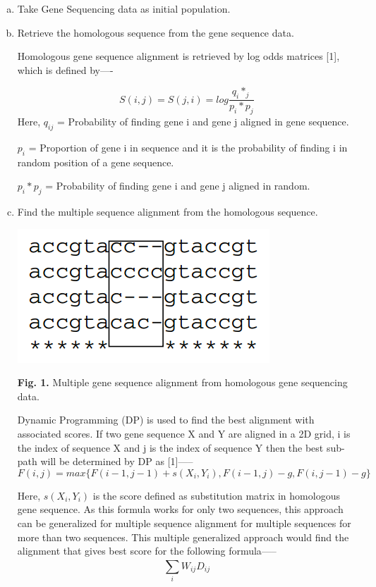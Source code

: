\documentclass[preprint,12pt]{elsarticle}
\begin{document}
\begin{enumerate}[a)] %
	\item Take Gene Sequencing data as initial population.
    \item Retrieve the homologous sequence from the gene sequence data. 



Homologous gene sequence alignment is retrieved by log odds matrices [1], which is defined by—-

$$S(i,j)=S(j,i)=log \frac{q_i*_j}{p_i*p_j}$$
Here, $q_{ij}$ = Probability of finding gene i and gene j aligned in gene sequence.

$p_i$  = Proportion of gene i in sequence and it is the probability of finding i in random position of a gene sequence.

$p_i*p_j$ = Probability of finding gene i and gene j aligned in random.

	\item Find the multiple sequence alignment from the homologous sequence.
\begin{center}
\includegraphics{FIG01.PNG}

\textbf{Fig. 1.} Multiple gene sequence alignment from homologous gene sequencing data.
\end{center}

	Dynamic Programming (DP) is used to find the best alignment with associated scores. If two gene sequence X and Y are aligned in a 2D grid, i is the index of sequence X and j is the index of sequence Y then the best sub-path will be determined by DP as [1]—--
    $$F(i,j)=max\{{F(i-1,j-1)+s(X_i,Y_i),	F(i-1,j)-g,	F(i,j-1)-g}\}$$

	Here, $s(X_i,Y_i)$ is the score defined as substitution matrix in homologous gene sequence. As this formula works for only two sequences, this approach can be generalized for multiple sequence alignment for multiple sequences for more than two sequences. This multiple generalized approach would find the alignment that gives best score for the following formula—--
    $$\sum_{i}^{} W_{ij}D_{ij}$$
    

\end{enumerate}
\end{document}
